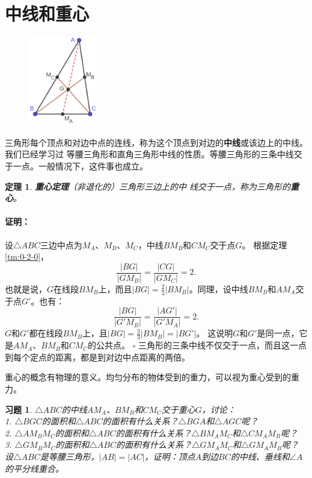 \documentclass[12pt,UTF8]{ctexbook}
\newtheorem{tm}{定理}[section]
\newenvironment{proof2}{\paragraph{\textbf{证明：}}}{\hfill$\square$}
\newtheorem{xt}{习题}[section]
\begin{document}
\section{中线和重心}
\begin{figure} %
    \vspace{-60pt}
    \includegraphics[width=0.27\textwidth]{tu/三角形重心证明.png}
\end{figure}
三角形每个顶点和对边中点的连线，称为这个顶点到对边的\textbf{中线}或该边上的中线。我们已经学习过
等腰三角形和直角三角形中线的性质。等腰三角形的三条中线交于一点。一般情况下，这件事也成立。

\begin{tm}{\textbf{重心定理}}\label{tm:1-3-0}
    （非退化的）三角形三边上的中
    线交于一点，称为三角形的\textbf{重心}。
\end{tm}
\begin{proof2}
    设$\triangle ABC$三边中点为$M_A$、$M_B$、$M_C$，中线$BM_B$和$CM_C$交于点$G$。
    根据定理\ref{tm:0-2-0}，
    $$\frac{|BG|}{|GM_B|} = \frac{|CG|}{|GM_C|} = 2.$$
    也就是说，$G$在线段$BM_B$上，而且$|BG| = \frac23 |BM_B|$。同理，设中线$BM_B$和$AM_A$交于点$G'$。也有：
    $$\frac{|BG|}{|G'M_B|} = \frac{|AG'|}{|G'M_A|} = 2.$$
    $G$和$G'$都在线段$BM_B$上，且$|BG| = \frac23 |BM_B| = |BG'|$。
    这说明$G$和$G'$是同一点，它是$AM_A$、$BM_B$和$CM_C$的公共点。
\end{proof2}
三角形的三条中线不仅交于一点，而且这一点到每个定点的距离，都是到对边中点距离的两倍。

重心的概念有物理的意义。均匀分布的物体受到的重力，可以视为重心受到的重力。
\begin{xt}\label{xt:1-3-0}
    $\triangle ABC$的中线$AM_A$、$BM_B$和$CM_C$交于重心$G$，讨论：\\
    1. $\triangle BGC$的面积和$\triangle ABC$的面积有什么关系？$\triangle BGA$和$\triangle AGC$呢？\\
    2. $\triangle AM_BM_C$的面积和$\triangle ABC$的面积有什么关系？$\triangle BM_AM_C$和$\triangle CM_AM_B$呢？\\
    3. $\triangle GM_BM_C$的面积和$\triangle ABC$的面积有什么关系？$\triangle GM_AM_C$和$\triangle GM_AM_B$呢？\\
    设$\triangle ABC$是等腰三角形，$|AB| = |AC|$，证明：顶点$A$到边$BC$的中线、垂线和$\angle A$的平分线重合。\\
\end{xt}
\end{document}
